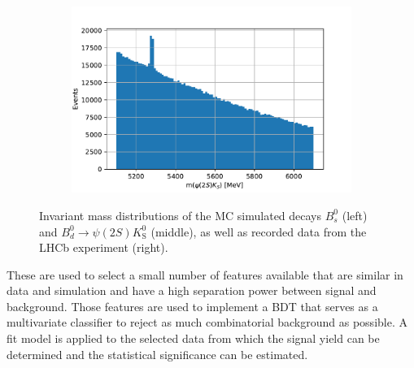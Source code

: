 \begin{figure}[tb]
\begin{subfigure}{.32\textwidth}
  \end{subfigure}
  \begin{subfigure}{.32\textwidth}
    \includegraphics[width=\linewidth]{plots/data_hist.pdf}
  \end{subfigure}
  \caption{Invariant mass distributions of the MC simulated decays $B^0_s$ (left) and $B^0_d \to \psi(2S) K^0_\mathrm{S}$ (middle), as well as recorded data from the LHCb experiment (right).}
  \label{fig:dists}
\end{figure}

These are used to select a small number of features available that are similar in data and simulation and have a high separation power between signal and background. Those features are used to implement a BDT that serves as a multivariate classifier to reject as much combinatorial background as possible. A fit model is applied to the selected data from which the signal yield can be determined and the statistical significance can be estimated.

